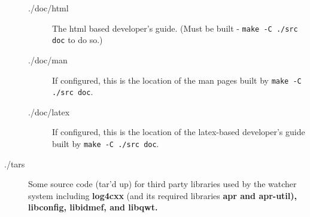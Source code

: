 \documentclass{article}
\begin{document}
\begin{description}
\begin{description}
\item[.\slash doc\slash html] The html based developer's guide. (Must be built - \vbox{{\tt make -C .\slash src doc}} to do so.)
\item[.\slash doc\slash man] If configured, this is the location of the man pages built by \vbox{{\tt make -C .\slash src doc}}.
\item[.\slash doc\slash latex] If configured, this is the location of the latex-based developer's guide built by 
\vbox{{\tt make -C ./src doc}}.
\end{description}
\item[.\slash tars] Some source code (tar'd up) for third party libraries used by the watcher system including {\bf log4cxx} (and its required libraries \bf{apr} and
\bf{apr-util}), \bf{libconfig}, \bf{libidmef}, and \bf{libqwt}. 
\end{description}
\end{document}
